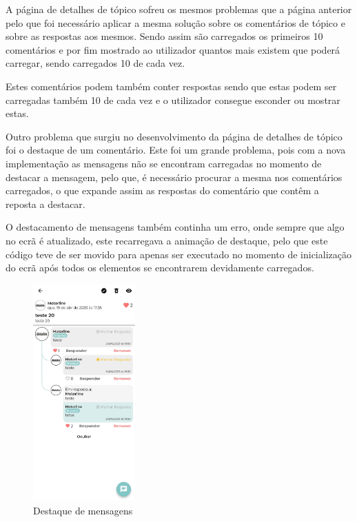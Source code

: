 A página de detalhes de tópico sofreu os mesmos problemas que a página anterior pelo que foi necessário aplicar a mesma solução sobre os comentários de tópico e sobre as respostas aos mesmos. Sendo assim são carregados os primeiros 10 comentários e por fim mostrado ao utilizador quantos mais existem que poderá carregar, sendo carregados 10 de cada vez.

Estes comentários podem também conter respostas sendo que estas podem ser carregadas também 10 de cada vez e o utilizador consegue esconder ou mostrar estas.

Outro problema que surgiu no desenvolvimento da página de detalhes de tópico foi o destaque de um comentário. Este foi um grande problema, pois com a nova implementação as mensagens não se encontram carregadas no momento de destacar a mensagem, pelo que, é necessário procurar a mesma nos comentários carregados, o que expande assim as respostas do comentário que contêm a reposta a destacar.

O destacamento de mensagens também continha um erro, onde sempre que algo no ecrã é atualizado, este recarregava a animação de destaque, pelo que este código teve de ser movido para apenas ser executado no momento de inicialização do ecrã após todos os elementos se encontrarem devidamente carregados.

\begin{figure}[htb]
  \centering
  \includegraphics[width=0.35\textwidth]{images/implementacao/frontend/forum/loading_topics/1686062701127.jpg}
  \caption{Destaque de mensagens}
  \label{fig:75}
\end{figure}
